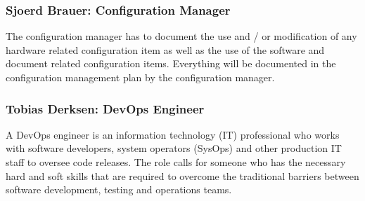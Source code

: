     \subsubsection{Sjoerd Brauer: Configuration Manager}
    The configuration manager has to document
    the use and / or modification of any hardware related configuration item as well as the use of the
    software and document related configuration items. Everything will be documented in the configuration management plan
    by the configuration manager.
   
    \subsubsection{Tobias Derksen: DevOps Engineer}
    A DevOps engineer is an information technology (IT) professional who works with software developers, 	system operators (SysOps) and other production IT staff to oversee code releases. The role calls for 	someone who has the necessary hard and soft skills that are required to overcome the traditional 			barriers between software development, testing and operations teams.  
